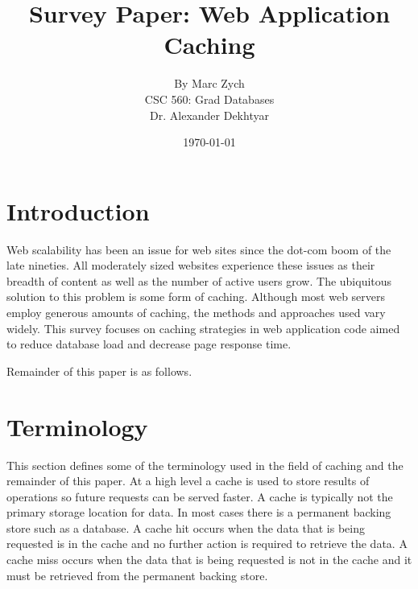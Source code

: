 \documentclass[12pt]{article}
\begin{document}
\title{\vfill Survey Paper: Web Application Caching}

\author{
By Marc Zych \vspace{10pt} \\
CSC 560: Grad Databases \vspace{10pt} \\
Dr. Alexander Dekhtyar \vspace{10pt} \\
}
\date{\today}

\maketitle


\thispagestyle{empty}
\newpage



\section{Introduction}
Web scalability has been an issue for web sites since the dot-com boom of the late nineties.
All moderately sized websites experience these issues as their breadth of content as well as the number of active users grow.
The ubiquitous solution to this problem is some form of caching.
Although most web servers employ generous amounts of caching, the methods and approaches used vary widely.
This survey focuses on caching strategies in web application code aimed to reduce database load and decrease page response time.


Remainder of this paper is as follows. %

\section{Terminology}
This section defines some of the terminology used in the field of caching and the remainder of this paper.
At a high level a cache is used to store results of operations so future requests can be served faster.
A cache is typically not the primary storage location for data.
In most cases there is a permanent backing store such as a database.
A cache hit occurs when the data that is being requested is in the cache and no further action is required to retrieve the data.
A cache miss occurs when the data that is being requested is not in the cache and it must be retrieved from the permanent backing store.
\end{document}
